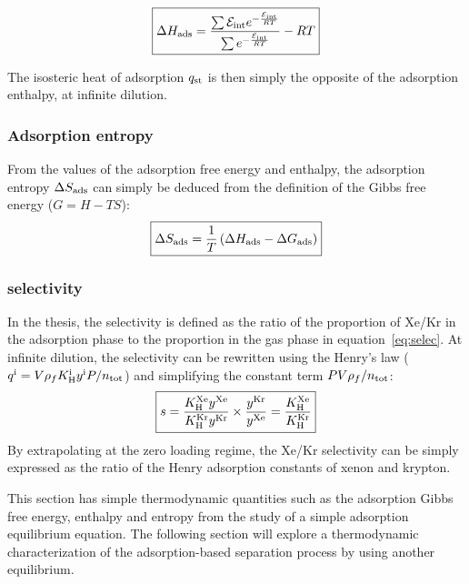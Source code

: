 \documentclass[main.tex]{subfiles}
\begin{document}
\begin{equation}\label{eq:ads_enthalpy}
  \boxed{
  \Delta H_{\text{ads}} = \dfrac{\sum \mathcal{E}_{\text{int}}e^{-\frac{\mathcal{E}_{\text{int}}}{RT}}}{\sum e^{-\frac{\mathcal{E}_{\text{int}}}{RT}}} - RT
  }
\end{equation}

The isosteric heat of adsorption $q_{\text{st}}$ is then simply the opposite of the adsorption enthalpy, at infinite dilution. 

\subsubsection{Adsorption entropy}

From the values of the adsorption free energy and enthalpy, the adsorption entropy $\Delta S_{\text{ads}}$ can simply be deduced from the definition of the Gibbs free energy ($G = H-TS$):
\begin{equation}\label{eq:ads_entropy}
  \boxed{
  \Delta S_{\text{ads}} = \dfrac{1}{T} \left(\Delta H_{\text{ads}} - \Delta G_{\text{ads}} \right)
  }
\end{equation}

\subsubsection{selectivity}

In the thesis, the selectivity is defined as the ratio of the proportion of Xe/Kr in the adsorption phase to the proportion in the gas phase in equation~\ref{eq:selec}. At infinite dilution, the selectivity can be rewritten using the Henry's law ($q^{\text{i}}=V\rho_f K_{\text{H}}^{\text{i}}y^{\text{i}}P/n_{\text{tot}}$) and simplifying the constant term $PV\rho_f/n_{\text{tot}}$:
\begin{equation}\label{eq:selec_0}
  \boxed{
  s = \dfrac{K_{\text{H}}^{\text{Xe}}y^{\text{Xe}}}{K_{\text{H}}^{\text{Kr}}y^{\text{Kr}}}\times\dfrac{y^{\text{Kr}}}{y^{\text{Xe}}} = \dfrac{K_{\text{H}}^{\text{Xe}}}{K_{\text{H}}^{\text{Kr}}}
  }
\end{equation}
By extrapolating at the zero loading regime, the Xe/Kr selectivity can be simply expressed as the ratio of the Henry adsorption constants of xenon and krypton.

This section has simple thermodynamic quantities such as the adsorption Gibbs free energy, enthalpy and entropy from the study of a simple adsorption equilibrium equation. The following section will explore a thermodynamic characterization of the adsorption-based separation process by using another equilibrium. 
\end{document}
